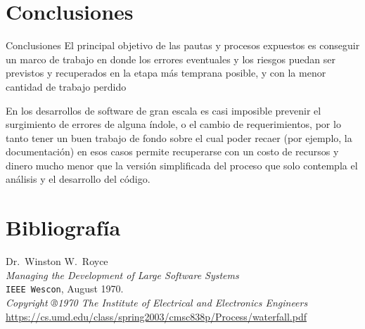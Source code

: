 \documentclass{beamer}
\begin{document}
\section{Conclusiones}
\begin{frame}{Conclusiones}
El principal objetivo de las pautas y procesos expuestos es conseguir un marco de trabajo en donde los errores eventuales y los riesgos puedan ser previstos y recuperados en la etapa más temprana posible, y con la menor cantidad de trabajo perdido

\vspace{1em}

En los desarrollos de software de gran escala es casi imposible prevenir el surgimiento de errores de alguna índole, o el cambio de requerimientos, por lo tanto tener un buen trabajo de fondo sobre el cual poder recaer (por ejemplo, la documentación) en esos casos permite recuperarse con un costo de recursos y dinero mucho menor que la versión simplificada del proceso que solo contempla el análisis y el desarrollo del código.
\end{frame}


\section{Bibliografía}

\begin{frame}[fragile]
\begin{thebibliography}{9}
  \footnotesize
  Dr.\ Winston W.\ Royce \\
  \emph{Managing the Development of Large Software Systems} \\
  \texttt{IEEE Wescon},
  August 1970. \\
  \textit{Copyright ®1970 The Institute of Electrical and Electronics Engineers} \\
  {\scriptsize\url{https://cs.umd.edu/class/spring2003/cmsc838p/Process/waterfall.pdf}}
\end{thebibliography}
\end{frame}
\end{document}
